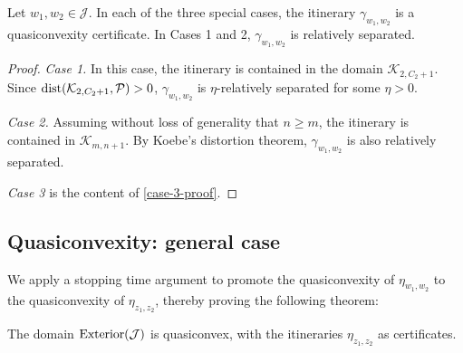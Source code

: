 \begin{lemma}
\label{case 1 rel. sep}
Let $w_1,w_2 \in \mathcal J$. In each of the three special cases, the itinerary $\gamma _{w_1,w_2}$ is a quasiconvexity certificate. In Cases 1 and 2, $\gamma _{w_1,w_2}$ is relatively separated.
\end{lemma}

\begin{proof}
\emph{Case 1.} In this case, the itinerary is contained in the domain $\mathcal K_{2, C_2+1}$.
Since $\operatorname{dist}(\mathcal K_{2, C_2+1}, \mathcal P)>0$, $\gamma _{w_1,w_2}$ is $\eta$-relatively separated for some $\eta>0$. 

\emph{Case 2.}
Assuming without loss of generality that $n \geq m$, the itinerary is contained in $\mathcal K_{m,n+1}$. By Koebe's distortion theorem, $\gamma _{w_1,w_2}$ is also relatively separated.

\emph{Case 3} is the content of \cref{case-3-proof}.
\end{proof}

\subsection{Quasiconvexity: general case}
We apply a stopping time argument to promote the quasiconvexity of $\eta_{w_1,w_2}$ to the quasiconvexity of $\eta_{z_1,z_2}$, thereby proving the following theorem:

\begin{theorem} \label{quasiconvex-Cauliflower}
	The domain $\operatorname{Exterior}(\mathcal{J})$ is quasiconvex, with the itineraries $\eta_{z_1,z_2}$ as certificates.
\end{theorem}

